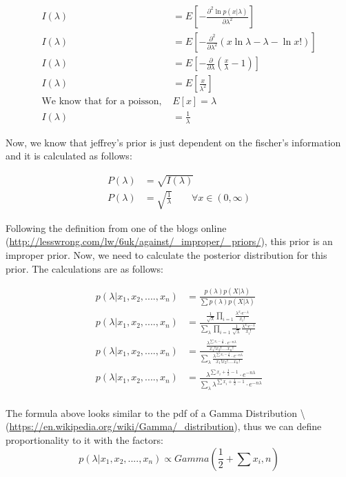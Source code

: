 \documentclass[]{article}
\begin{document}
\begin{align*}
    I(\lambda) &= E\left[-\frac{\partial^2 \ln p(x|\lambda)}{\partial \lambda^2}\right] \\
    I(\lambda) &= E\left[-\frac{\partial^2}{\partial \lambda^2} (x\ln \lambda - \lambda - \ln x!)\right] \\
    I(\lambda) &= E\left[-\frac{\partial}{\partial \lambda} \left(\frac{x}{\lambda} - 1\right)\right] \\
    I(\lambda) &= E\left[\frac{x}{\lambda^2}\right] \\
    \text{We know that for a poisson, } & E[x] = \lambda \\
    I(\lambda) &= \frac{1}{\lambda}
\end{align*}

Now, we know that jeffrey's prior is just dependent on the fischer's
information and it is calculated as follows:

\begin{align*}
    P(\lambda) &= \sqrt{I(\lambda)} \\
    P(\lambda) &= \sqrt{\frac{1}{\lambda}} \qquad \forall x \in (0,\infty)
\end{align*}

Following the definition from one of the blogs online
(\url{http://lesswrong.com/lw/6uk/against/_improper/_priors/}), this
prior is an improper prior. Now, we need to calculate the posterior
distribution for this prior. The calculations are as follows:

\begin{align*}
    p(\lambda | x_1, x_2,...., x_n) &= \frac{p(\lambda) p(X|\lambda)}{\sum p(\lambda) p(X|\lambda)} \\
    p(\lambda | x_1, x_2,...., x_n) &= \frac{\frac{1}{\sqrt{\lambda}} \prod_{i=1} \frac{\lambda^{x_i}e^{-\lambda}}{x_i!}}{\sum_{\lambda}\prod_{i=1} \frac{1}{\sqrt{\lambda} }\frac{\lambda^{x_i}e^{-\lambda}}{x_i!}} \\
    p(\lambda | x_1, x_2,...., x_n) &= \frac{\frac{\lambda^{\sum x_i - \frac{1}{2}}\cdot e^{-n\lambda}}{x_1!x_2!....x_n!}}{\sum_{\lambda} \frac{\lambda^{\sum x_i - \frac{1}{2}}\cdot e^{-n\lambda}}{x_1!x_2!....x_n!}} \\
    p(\lambda | x_1, x_2,...., x_n) &= \frac{\lambda^{\sum x_i + \frac{1}{2} - 1}\cdot e^{-n\lambda}}{\sum_{\lambda} \lambda^{\sum x_i + \frac{1}{2} - 1}\cdot e^{-n\lambda}} \\
\end{align*}

The formula above looks similar to the pdf of a Gamma Distribution
\textbackslash{}
(\url{https://en.wikipedia.org/wiki/Gamma/_distribution}), thus we can
define proportionality to it with the factors:
\[p(\lambda | x_1, x_2,...., x_n) \propto Gamma\left(\frac{1}{2} + \sum x_i, n\right)\]
\end{document}
